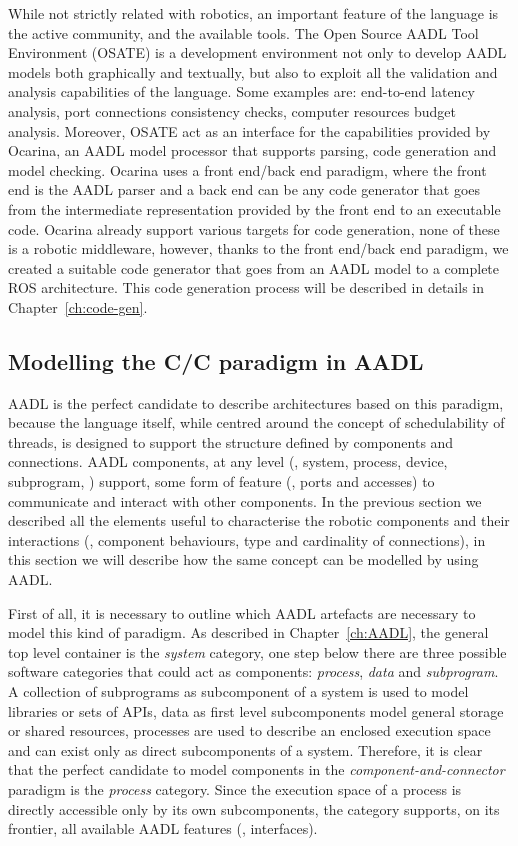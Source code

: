 While not strictly related with robotics, an important feature of the language is the active community, and the available tools. The Open Source AADL Tool Environment (OSATE) is a development environment not only to develop AADL models both graphically and textually, but also to exploit all the validation and analysis capabilities of the language. Some examples are: end-to-end latency analysis, port connections consistency checks, computer resources budget analysis. Moreover, OSATE act as an interface for the capabilities provided by Ocarina, an AADL model processor that supports parsing, code generation and model checking. Ocarina uses a front end/back end paradigm, where the front end is the AADL parser and a back end can be any code generator that goes from the intermediate representation provided by the front end to an executable code. Ocarina already support various targets for code generation, none of these is a robotic middleware, however, thanks to the front end/back end paradigm, we created a suitable code generator that goes from an AADL model to a complete ROS architecture. This code generation process will be described in details in Chapter~\ref{ch:code-gen}.

\subsection{Modelling the C/C paradigm in AADL}
\label{sec:aadl-cnc}
AADL is the perfect candidate to describe architectures based on this paradigm, because the language itself, while centred around the concept of schedulability of threads, is designed to support the structure defined by components and connections. AADL components, at any level (\eg, system, process, device, subprogram, \etc) support, some form of feature (\ie, ports and accesses) to communicate and interact with other components. In the previous section we described all the elements useful to characterise the robotic components and their interactions (\ie, component behaviours, type and cardinality of connections), in this section we will describe how the same concept can be modelled by using AADL.

First of all, it is necessary to outline which AADL artefacts are necessary to model this kind of paradigm. As described in Chapter~\ref{ch:AADL}, the general top level container is the \textit{system} category, one step below there are three possible software categories that could act as components: \textit{process}, \textit{data} and \textit{subprogram}. A collection of subprograms as subcomponent of a system is used to model libraries or sets of APIs, data as first level subcomponents model general storage or shared resources, processes are used to describe an enclosed execution space and can exist only as direct subcomponents of a system. Therefore, it is clear that the perfect candidate to model components in the \textit{component-and-connector} paradigm is the \textit{process} category. Since the execution space of a process is directly accessible only by its own subcomponents, the category supports, on its frontier, all available AADL features (\ie, interfaces). 

